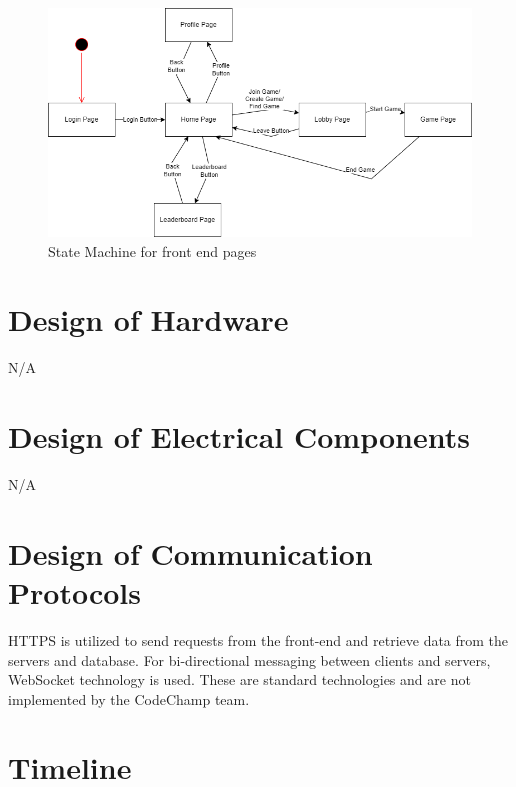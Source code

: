 \documentclass[12pt, titlepage]{article}
\begin{document}
\begin{figure}[H]
\centering
\includegraphics[width=1\textwidth]{Design/SystDesign/State.png}
\caption{State Machine for front end pages}
\end{figure}

\section{Design of Hardware}

N/A

\section{Design of Electrical Components}

N/A

\section{Design of Communication Protocols}

HTTPS is utilized to send requests from the front-end and retrieve data from the servers and database. For bi-directional messaging between clients and servers, WebSocket technology is used. These are standard technologies and are not implemented by the CodeChamp team.

\section{Timeline}
\end{document}
